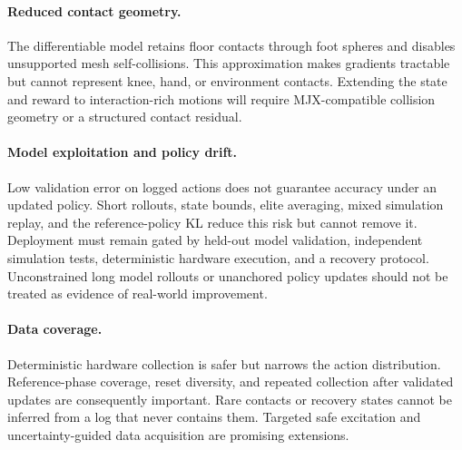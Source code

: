 \documentclass[10pt,twocolumn]{article}
\begin{document}
\paragraph{Reduced contact geometry.}
The differentiable model retains floor contacts through foot spheres and disables unsupported mesh self-collisions. This approximation makes gradients tractable but cannot represent knee, hand, or environment contacts. Extending the state and reward to interaction-rich motions will require MJX-compatible collision geometry or a structured contact residual.

\paragraph{Model exploitation and policy drift.}
Low validation error on logged actions does not guarantee accuracy under an updated policy. Short rollouts, state bounds, elite averaging, mixed simulation replay, and the reference-policy KL reduce this risk but cannot remove it. Deployment must remain gated by held-out model validation, independent simulation tests, deterministic hardware execution, and a recovery protocol. Unconstrained long model rollouts or unanchored policy updates should not be treated as evidence of real-world improvement.

\paragraph{Data coverage.}
Deterministic hardware collection is safer but narrows the action distribution. Reference-phase coverage, reset diversity, and repeated collection after validated updates are consequently important. Rare contacts or recovery states cannot be inferred from a log that never contains them. Targeted safe excitation and uncertainty-guided data acquisition are promising extensions.

\end{document}
